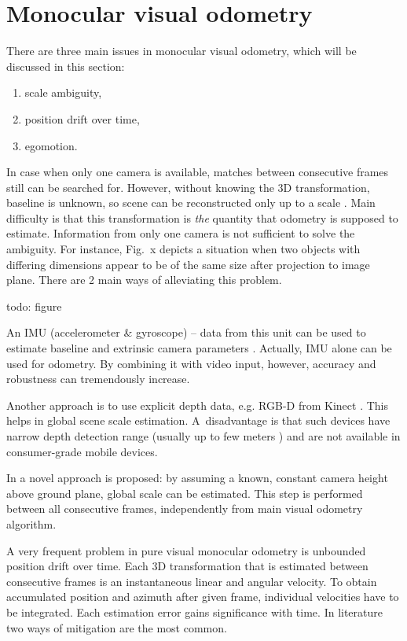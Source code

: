 
\section{Monocular visual odometry}
\label{sec:mono}

There are three main issues in monocular visual odometry, which will be discussed in this section:
\begin{enumerate}
	\item scale ambiguity,
	\item position drift over time,
	\item egomotion.
\end{enumerate}

In case when only one camera is available, matches between consecutive frames still can be searched for. However, without knowing the 3D transformation, baseline is unknown, so scene can be reconstructed only up to a scale \cite{hartley2003multiple}. Main difficulty is that this transformation is \textit{the} quantity that odometry is supposed to estimate. Information from only one camera is not sufficient to solve the ambiguity. For instance, Fig.~x depicts a situation when two objects with differing dimensions appear to be of the same size after projection to image plane. There are 2 main ways of alleviating this problem.

todo: figure

An IMU (accelerometer \& gyroscope) -- data from this unit can be used to estimate baseline and extrinsic camera parameters \cite{tracked_vehicles}. Actually, IMU alone can be used for odometry. By combining it with video input, however, accuracy and robustness can tremendously increase.

Another approach is to use explicit depth data, e.g. RGB-D from Kinect \cite{yu2013improved}. This helps in global scene scale estimation. A~disadvantage is that such devices have narrow depth detection range (usually up to few meters \cite{accuracy_and_resoulution}) and are not available in consumer-grade mobile devices.

In \cite{robust_scale} a novel approach is proposed: by assuming a known, constant camera height above ground plane, global scale can be estimated. This step is performed between all consecutive frames, independently from main visual odometry algorithm.

A very frequent problem in pure visual monocular odometry is unbounded position drift over time. Each 3D transformation that is estimated between consecutive frames is an instantaneous linear and angular velocity. To obtain accumulated position and azimuth after given frame, individual velocities have to be integrated. Each estimation error gains significance with time. In literature two ways of mitigation are the most common.

